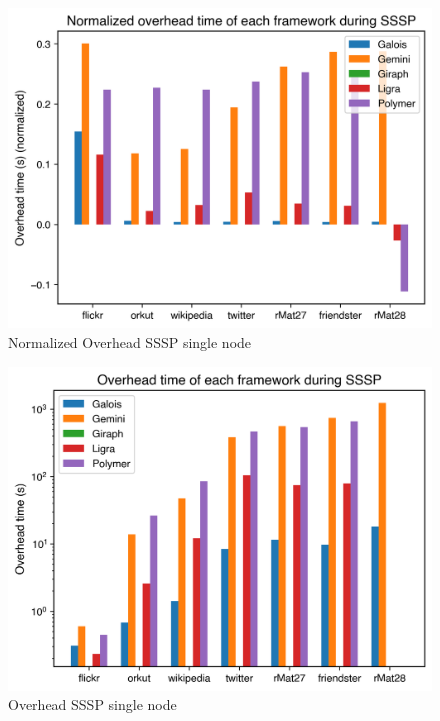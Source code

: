 \begin{figure}
	\includegraphics[width=\columnwidth]{../../plots/singleNodeSSSP_overheadTimeNormalized.png}
	\caption{Normalized Overhead SSSP single node}
	\label{fig:singleNodeSSSP_overheadNormalized}
\end{figure}

\begin{figure}
	\includegraphics[width=\columnwidth]{../../plots/singleNodeSSSP_overheadTime.png}
	\caption{Overhead SSSP single node}
	\label{fig:singleNodeSSSP_overhead}
\end{figure}

